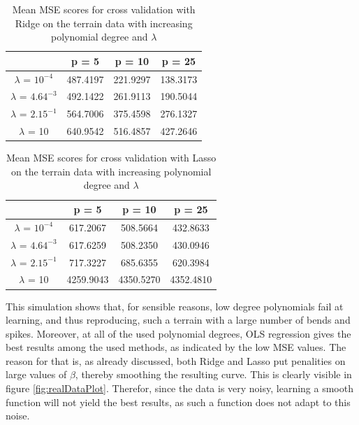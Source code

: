 \documentclass{article}
\begin{document}
\begin{table}[h!]
\centering
\begin{tabular}{||c c c c||}
\hline
& p = 5 & p = 10 & p = 25 \\
\hline
$\lambda$ = $10^{-4}$ & 487.4197 & 221.9297 & 138.3173 \\
\hline
$\lambda$ = $4.64^{-3}$ & 492.1422 & 261.9113 & 190.5044 \\ 
\hline
$\lambda$ = $2.15^{-1}$ & 564.7006 & 375.4598 & 276.1327 \\
\hline
$\lambda$ = 10 & 640.9542 & 516.4857 & 427.2646 \\
\hline
\end{tabular}
\caption{Mean MSE scores for cross validation with Ridge on the terrain data with increasing polynomial degree and $\lambda$}
\label{tbl:2}
\end{table}


\begin{table}[h!]
\centering
\begin{tabular}{||c c c c||}
\hline
& p = 5 & p = 10 & p = 25 \\
\hline
$\lambda$ = $10^{-4}$ & 617.2067 & 508.5664 & 432.8633\\
\hline
$\lambda$ = $4.64^{-3}$ & 617.6259 & 508.2350 & 430.0946 \\ 
\hline
$\lambda$ = $2.15^{-1}$ & 717.3227 & 685.6355 & 620.3984 \\
\hline
$\lambda$ = 10 & 4259.9043 & 4350.5270 & 4352.4810 \\
\hline
\end{tabular}
\caption{Mean MSE scores for cross validation with Lasso on the terrain data with increasing polynomial degree and $\lambda$}
\label{tbl:3}
\end{table}
This simulation shows that, for sensible reasons, low degree polynomials fail at learning, and thus reproducing, such a terrain with a large number of bends and spikes. Moreover, at all of the used polynomial degrees, OLS regression gives the best results among the used methods, as indicated by the low MSE values. The reason for that is, as already discussed, both Ridge and Lasso put penalities on large values of $\beta$, thereby smoothing the resulting curve. This is clearly visible in figure \ref{fig:realDataPlot}. Therefor, since the data is very noisy, learning a smooth function will not yield the best results, as such a function does not adapt to this noise.
\end{document}
